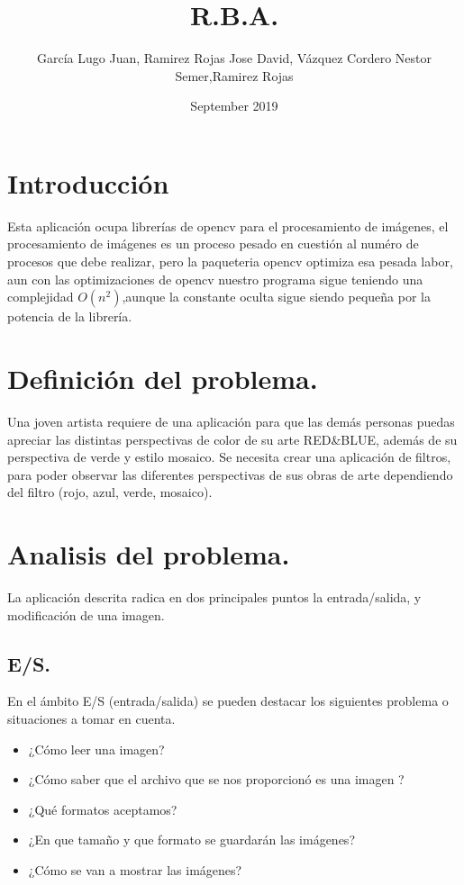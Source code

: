 \documentclass{article}
\title{R.B.A.}
\author{García Lugo Juan, Ramirez Rojas Jose David, Vázquez Cordero Nestor Semer,Ramirez Rojas }
\date{September 2019}
\begin{document}
\maketitle
\section{Introducción}
Esta aplicación ocupa librerías de opencv para el procesamiento de imágenes, el procesamiento de imágenes es un proceso pesado en cuestión al numéro de procesos que debe realizar, pero la paqueteria opencv optimiza esa pesada labor, aun con las optimizaciones de opencv nuestro programa sigue teniendo una complejidad $O(n^{2})$,aunque la constante oculta sigue siendo pequeña por la potencia de la librería.
\section{Definición del problema.}
Una joven artista requiere de una aplicación para que las demás personas puedas apreciar las distintas perspectivas de color de su arte RED\&BLUE, además de su perspectiva de verde y estilo mosaico.\newline
Se necesita  crear una aplicación de filtros, para poder observar las diferentes perspectivas de sus obras de arte dependiendo del filtro (rojo, azul, verde, mosaico).
\section{Analisis del problema.}
La aplicación descrita radica en dos principales puntos la entrada/salida, y modificación de una imagen.
\subsection{E/S.}
En el ámbito E/S (entrada/salida) se pueden destacar los siguientes problema o situaciones a tomar en cuenta.
\begin{itemize}
    \item ¿Cómo leer una imagen?
    \item ¿Cómo saber que el archivo que se nos proporcionó es una imagen ?
    \item ¿Qué formatos aceptamos?
    \item ¿En que tamaño y que formato se guardarán las imágenes?
    \item ¿Cómo se van a mostrar las imágenes?
    \end{itemize}
\end{document}
